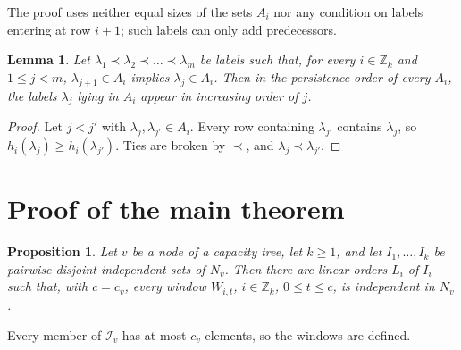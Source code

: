 \documentclass[11pt]{amsart}
\newtheorem{proposition}[theorem]{Proposition}
\newtheorem{lemma}[theorem]{Lemma}
\theoremstyle{definition}
\theoremstyle{remark}
\numberwithin{equation}{section}
\newcommand{\Z}{\mathbb{Z}}
\newcommand{\I}{\mathcal{I}}
\begin{document}
The proof uses neither equal sizes of the sets $A_i$ nor any condition on labels entering at row $i+1$; such labels can only add predecessors.

\begin{lemma}\label{lem:nested}
Let $\lambda_1\prec\lambda_2\prec\dots\prec\lambda_m$ be labels such that, for every $i\in\Z_k$ and $1\le j<m$, $\lambda_{j+1}\in A_i$ implies $\lambda_j\in A_i$. Then in the persistence order of every $A_i$, the labels $\lambda_j$ lying in $A_i$ appear in increasing order of $j$.
\end{lemma}

\begin{proof}
Let $j<j'$ with $\lambda_j,\lambda_{j'}\in A_i$. Every row containing $\lambda_{j'}$ contains $\lambda_j$, so $h_i(\lambda_j)\ge h_i(\lambda_{j'})$. Ties are broken by $\prec$, and $\lambda_j\prec\lambda_{j'}$.
\end{proof}

\section{Proof of the main theorem}\label{sec:proof}

\begin{proposition}\label{prop:windows}
Let $v$ be a node of a capacity tree, let $k\ge1$, and let $I_1,\dots,I_k$ be pairwise disjoint independent sets of $N_v$. Then there are linear orders $L_i$ of $I_i$ such that, with $c=c_v$, every window $W_{i,t}$, $i\in\Z_k$, $0\le t\le c$, is independent in $N_v$.
\end{proposition}

Every member of $\I_v$ has at most $c_v$ elements, so the windows are defined.
\end{document}
